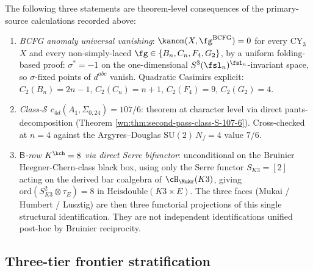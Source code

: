 \begin{theorem}
\label{wn:thm:second-pass-promotions}

The following three statements are theorem-level consequences of the
primary-source calculations recorded above:
\begin{enumerate}
\item \emph{BCFG anomaly universal vanishing}:
$\kanom(X, \fg^{\mathrm{BCFG}}) = 0$ for every CY$_3$ $X$ and every
non-simply-laced $\fg \in \{B_n, C_n, F_4, G_2\}$, by a
uniform folding-based proof: $\sigma^{\ast} = -1$ on the
one-dimensional $S^3(\fsl_n)^{\fsl_n}$-invariant space, so $\sigma$-fixed
points of $d^{abc}$ vanish. Quadratic Casimirs explicit:
$C_2(B_n) = 2n - 1$, $C_2(C_n) = n + 1$, $C_2(F_4) = 9$,
$C_2(G_2) = 4$.
\item \emph{Class-$\mathcal{S}$ $c_{4d}(A_1, \Sigma_{0, 24}) = 107/6$}:
theorem at character level via direct pants-decomposition
(Theorem \ref{wn:thm:second-pass-class-S-107-6}). Cross-checked at
$n = 4$ against the Argyres--Douglas $\mathrm{SU}(2)\,N_f = 4$ value
$7/6$.
\item \emph{$\mathsf{B}$-row $K^{\kch} = 8$ via direct Serre bifunctor}:
unconditional on the Bruinier Heegner-Chern-class black box, using
only the Serre functor $S_{K3} = [2]$ acting on the derived bar
coalgebra of $\cH_{\Mukr}(K3)$, giving $\mathrm{ord}(S_{K3}^2 \otimes
\tau_E) = 8$ in $\mathrm{Heisdouble}(K3 \times E)$. The three faces
(Mukai / Humbert / Lusztig) are then three functorial projections of
this single structural identification. They are not independent
identifications unified post-hoc by Bruinier reciprocity.
\end{enumerate}
\end{theorem}

\subsection{Three-tier frontier stratification}
\label{wn:subsec:second-pass-frontier-tiers}

